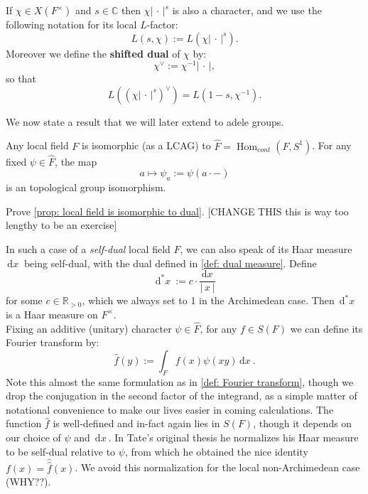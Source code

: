 \documentclass[11pt, x11names]{book}
\newcommand{\rr}{\mathbb{R}}
\newcommand{\cc}{\mathbb{C}}
\renewcommand{\brack}[1]{\left(   #1 \right)}
\newcommand{\abs}[1]{\left| \, #1  \,\right|}
\renewcommand{\hat}{\widehat}
\DeclareMathOperator{\Hom}{Hom}
\newcommand{\inv}[1]{#1^{-1}}
\newcommand{\dx}{\, \mathrm{d}x \ }
\renewcommand{\d}[1]{\, \mathrm{d}#1 \ }
\begin{document}
\begin{defn}
\label{def: shifted dual and L(s, chi) notation}
    If $\chi \in X(F^\times)$ and $s \in \cc$ then $\chi \abs{\cdot}^s$ is also a character, and we use the following notation for its local $L$-factor:
    \begin{equation*}
        L(s, \chi) := L(\chi \abs{\cdot}^s).
    \end{equation*}
    Moreover we define the \textbf{shifted dual} of $\chi$ by:
    \begin{equation*}
        \chi^\lor := \inv{\chi}\abs{\cdot},
    \end{equation*}
    so that
    \begin{equation*}
        L\brack{(\chi \abs{\cdot}^s)^\lor} = L\brack{1-s, \inv{\chi}}.
    \end{equation*}
\end{defn}

We now state a result that we will later extend to adele groups.
\begin{prop}
\label{prop: local field is isomorphic to dual}
Any local field $F$ is isomorphic (as a LCAG) to $\hat{F} = \Hom_{cont}(F, S^1)$. For any fixed $\psi \in \hat{F}$, the map
\begin{equation*}
    a \mapsto \psi_a := \psi(a \cdot  -)
\end{equation*}
is an topological group isomorphism.
\end{prop}
\begin{exercise}
    Prove \ref{prop: local field is isomorphic to dual}. [CHANGE THIS this is way too lengthy to be an exercise]
\end{exercise}

In such a case of a \textit{self-dual} local field $F$, we can also speak of its Haar measure $\dx$ being self-dual, with the dual defined in \ref{def: dual measure}. Define 
\begin{equation}
\label{eqn: measure on F^times}
    \d{^*x} := c \cdot \frac{\dx}{\abs{x}}
\end{equation}
for some $c \in \rr_{> 0}$, which we always set to 1 in the Archimedean case. Then $\d{^*x}$ is a Haar measure on $F^\times$.\\
Fixing an additive (unitary) character $\psi \in \hat{F}$, for any $f \in S(F)$ we can define its Fourier transform by:
\begin{equation}
\label{eqn: Fourier transform local-zeta-func}
    \hat{f}(y) := \int_F f(x)\psi(xy)\dx.
\end{equation}
Note this almost the same formulation as in \ref{def: Fourier transform}, though we drop the conjugation in the second factor of the integrand, as a simple matter of notational convenience to make our lives easier in coming calculations. The function $\hat{f}$ is well-defined and in-fact again lies in $S(F)$, though it depends on our choice of $\psi$ and $\dx$. In Tate's original thesis he normalizes his Haar measure to be self-dual relative to $\psi$, from which he obtained the nice identity $f(x) = \hat{\hat{f}}(x)$. We avoid this normalization for the local non-Archimedean case (WHY??).
\end{document}
